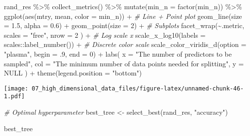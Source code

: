 \documentclass[
]{book}
\newenvironment{Shaded}{\begin{snugshade}}{\end{snugshade}}
\newcommand{\AttributeTok}[1]{\textcolor[rgb]{0.77,0.63,0.00}{#1}}
\newcommand{\CommentTok}[1]{\textcolor[rgb]{0.56,0.35,0.01}{\textit{#1}}}
\newcommand{\ConstantTok}[1]{\textcolor[rgb]{0.00,0.00,0.00}{#1}}
\newcommand{\DecValTok}[1]{\textcolor[rgb]{0.00,0.00,0.81}{#1}}
\newcommand{\FloatTok}[1]{\textcolor[rgb]{0.00,0.00,0.81}{#1}}
\newcommand{\FunctionTok}[1]{\textcolor[rgb]{0.00,0.00,0.00}{#1}}
\newcommand{\NormalTok}[1]{#1}
\newcommand{\OtherTok}[1]{\textcolor[rgb]{0.56,0.35,0.01}{#1}}
\newcommand{\SpecialCharTok}[1]{\textcolor[rgb]{0.00,0.00,0.00}{#1}}
\newcommand{\StringTok}[1]{\textcolor[rgb]{0.31,0.60,0.02}{#1}}
\begin{document}
\begin{Shaded}
\begin{Highlighting}[]
\NormalTok{rand\_res }\SpecialCharTok{\%\textgreater{}\%}
  \FunctionTok{collect\_metrics}\NormalTok{() }\SpecialCharTok{\%\textgreater{}\%}
  \FunctionTok{mutate}\NormalTok{(}\AttributeTok{min\_n =} \FunctionTok{factor}\NormalTok{(min\_n)) }\SpecialCharTok{\%\textgreater{}\%}
  \FunctionTok{ggplot}\NormalTok{(}\FunctionTok{aes}\NormalTok{(mtry, mean, }\AttributeTok{color =}\NormalTok{ min\_n)) }\SpecialCharTok{+}
  \CommentTok{\# Line + Point plot}
  \FunctionTok{geom\_line}\NormalTok{(}\AttributeTok{size =} \FloatTok{1.5}\NormalTok{, }\AttributeTok{alpha =} \FloatTok{0.6}\NormalTok{) }\SpecialCharTok{+}
  \FunctionTok{geom\_point}\NormalTok{(}\AttributeTok{size =} \DecValTok{2}\NormalTok{) }\SpecialCharTok{+}
  \CommentTok{\# Subplots}
  \FunctionTok{facet\_wrap}\NormalTok{(}\SpecialCharTok{\textasciitilde{}}\NormalTok{.metric,}
    \AttributeTok{scales =} \StringTok{"free"}\NormalTok{,}
    \AttributeTok{nrow =} \DecValTok{2}
\NormalTok{  ) }\SpecialCharTok{+}
  \CommentTok{\# Log scale x}
  \FunctionTok{scale\_x\_log10}\NormalTok{(}\AttributeTok{labels =}\NormalTok{ scales}\SpecialCharTok{::}\FunctionTok{label\_number}\NormalTok{()) }\SpecialCharTok{+}
  \CommentTok{\# Discrete color scale}
  \FunctionTok{scale\_color\_viridis\_d}\NormalTok{(}\AttributeTok{option =} \StringTok{"plasma"}\NormalTok{, }\AttributeTok{begin =}\NormalTok{ .}\DecValTok{9}\NormalTok{, }\AttributeTok{end =} \DecValTok{0}\NormalTok{) }\SpecialCharTok{+}
  \FunctionTok{labs}\NormalTok{(}
    \AttributeTok{x =} \StringTok{"The number of predictors to be sampled"}\NormalTok{,}
    \AttributeTok{col =} \StringTok{"The minimum number of data points needed for splitting"}\NormalTok{,}
    \AttributeTok{y =} \ConstantTok{NULL}
\NormalTok{  ) }\SpecialCharTok{+}
  \FunctionTok{theme}\NormalTok{(}\AttributeTok{legend.position =} \StringTok{"bottom"}\NormalTok{)}
\end{Highlighting}
\end{Shaded}

\texttt{[image: 07\_high\_dimensional\_data\_files/figure-latex/unnamed-chunk-46-1.pdf]}

\begin{Shaded}
\begin{Highlighting}[]
\CommentTok{\# Optimal hyperparameter}
\NormalTok{best\_tree }\OtherTok{\textless{}{-}} \FunctionTok{select\_best}\NormalTok{(rand\_res, }\StringTok{"accuracy"}\NormalTok{)}

\NormalTok{best\_tree}
\end{Highlighting}
\end{Shaded}
\end{document}

